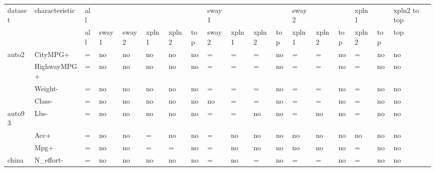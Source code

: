 


\begin{tabular}{llllllllllllllllll}
  \hline
  dataset & characteristic & all & & & & & & 
                             sway1 & & & & 
                             sway2 & & & 
                             xpln1 & & 
                             xpln2 to top \\
  & & all & sway1 & sway2 & xpln1 & xpln2 & top & 
  sway2 & xpln1 & xpln2 & top & 
  xpln1 & xpln2 & top &
  xpln2 & top &
  top \\
  \hline\hline
  auto2     & CityMPG+ & = & no & no & no & no & no & 
                         = & = & = & no & 
                         = & = & no & 
                         = & no & 
                         no \\
            & HighwayMPG+ & = & no & no & no & no & no & 
                            = & = & = & no & 
                            = & = & no & 
                            = & no & 
                            no \\
            & Weight- & = & no & no & no & no & no & 
                        = & = & = & no & 
                        = & = & no & 
                        = & no & 
                        no \\
            & Class-  & = & no & no & no & no & no & 
                        no & = & = & no & 
                        = & = & no & 
                        = & no & 
                        no  \\
  \hline
  auto93    & Lbs-  & = & no & no & no & no & no & 
                      = & = & no & no & 
                      = & no & no & 
                      = & no & 
                      no  \\
            & Acc+  & = & no & no & = & no & no & 
                      = & no & no & no & 
                      no & no & no & 
                      no & no & 
                      no  \\
            & Mpg+  & = & no & no & = & = & no & 
                      = & no & no & no & 
                      no & no & no & 
                      = & no & 
                      no  \\
  \hline
  china     & N\_effort- & = & no & no & no & no & no & 
                           = & no & = & no & 
                           = & = & no & 
                           = & no & 
                           no  \\

\end{tabular}
